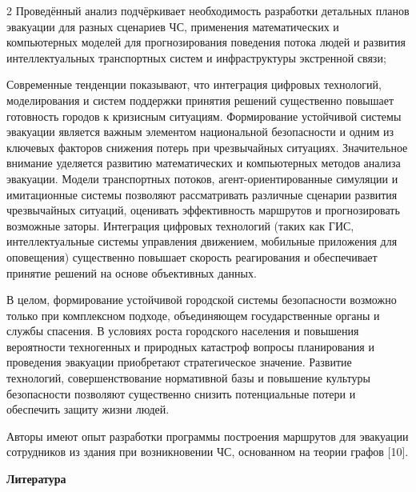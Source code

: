 \begin{multicols}{2}
Проведённый анализ подчёркивает необходимость разработки детальных
планов эвакуации для разных сценариев ЧС, применения математических и
компьютерных моделей для прогнозирования поведения потока людей и
развития интеллектуальных транспортных систем и инфраструктуры
экстренной связи;

Современные тенденции показывают, что интеграция цифровых технологий,
моделирования и систем поддержки принятия решений существенно повышает
готовность городов к кризисным ситуациям. Формирование устойчивой
системы эвакуации является важным элементом национальной безопасности и
одним из ключевых факторов снижения потерь при чрезвычайных ситуациях.
Значительное внимание уделяется развитию математических и компьютерных
методов анализа эвакуации. Модели транспортных потоков,
агент-ориентированные симуляции и имитационные системы позволяют
рассматривать различные сценарии развития чрезвычайных ситуаций,
оценивать эффективность маршрутов и прогнозировать возможные заторы.
Интеграция цифровых технологий (таких как ГИС, интеллектуальные системы
управления движением, мобильные приложения для оповещения) существенно
повышает скорость реагирования и обеспечивает принятие решений на основе
объективных данных.

В целом, формирование устойчивой городской системы безопасности возможно
только при комплексном подходе, объединяющем государственные органы и
службы спасения. В условиях роста городского населения и повышения
вероятности техногенных и природных катастроф вопросы планирования и
проведения эвакуации приобретают стратегическое значение. Развитие
технологий, совершенствование нормативной базы и повышение культуры
безопасности позволяют существенно снизить потенциальные потери и
обеспечить защиту жизни людей.

Авторы имеют опыт разработки программы построения маршрутов для
эвакуации сотрудников из здания при возникновении ЧС, основанном на
теории графов {[}10{]}.
\end{multicols}

\begin{center}
{\bfseries Литература}
\end{center}

